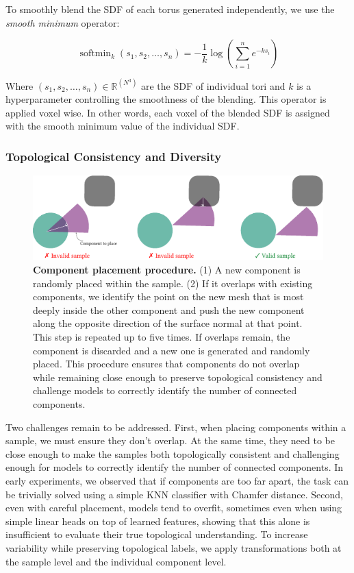To smoothly blend the SDF of each torus generated independently, we use the \textit{smooth minimum} operator:

\begin{equation}
\operatorname{softmin}_k(s_1, s_2, \dots, s_n) 
= -\frac{1}{k} \log \left( \sum_{i=1}^n e^{-k s_i} \right)
\end{equation}

Where $(s_1, s_2, \dots, s_n) \in \mathbb{R}^{(N^3)}$ are the SDF of individual tori and $k$ is a hyperparameter controlling the smoothness of the blending. This operator is applied voxel wise. In other words, each voxel of the blended SDF is assigned with the smooth minimum value of the individual SDF.

\subsubsection{Topological Consistency and Diversity}
\label{sssec:top-consistency}

\begin{figure}[h]
  \centering
  \includegraphics[width=\linewidth]{figs/topogen/placement.pdf}
  \caption{\textbf{Component placement procedure.} (1) A new component is randomly placed within the sample. (2) If it overlaps with existing components, we identify the point on the new mesh that is most deeply inside the other component and push the new component along the opposite direction of the surface normal at that point. This step is repeated up to five times. If overlaps remain, the component is discarded and a new one is generated and randomly placed. This procedure ensures that components do not overlap while remaining close enough to preserve topological consistency and challenge models to correctly identify the number of connected components.}
  \label{fig:topogen-placement}
\end{figure}

Two challenges remain to be addressed. First, when placing components within a sample, we must ensure they don't overlap. At the same time, they need to be close enough to make the samples both topologically consistent and challenging enough for models to correctly identify the number of connected components. In early experiments, we observed that if components are too far apart, the task can be trivially solved using a simple KNN classifier with Chamfer distance. Second, even with careful placement, models tend to overfit, sometimes even when using simple linear heads on top of learned features, showing that this alone is insufficient to evaluate their true topological understanding. To increase variability while preserving topological labels, we apply transformations both at the sample level and the individual component level.

